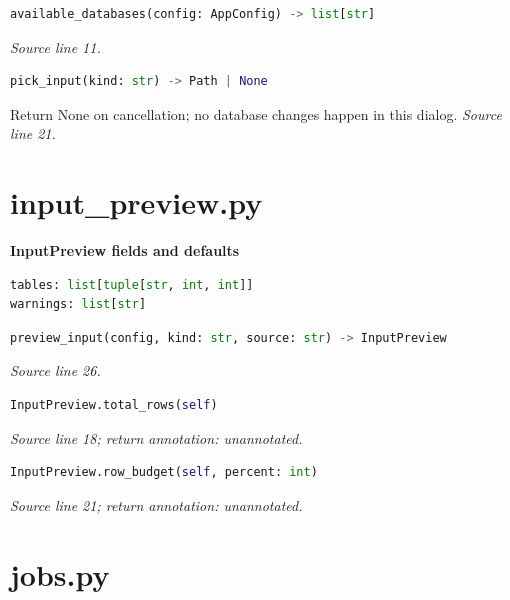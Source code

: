 \begin{lstlisting}[language=Python]
available_databases(config: AppConfig) -> list[str]
\end{lstlisting}


{\small \textit{Source line 11.}}



\begin{lstlisting}[language=Python]
pick_input(kind: str) -> Path | None
\end{lstlisting}


{\small Return None on cancellation; no database changes happen in this dialog. \textit{Source line 21.}}

\section{input\_preview.py}


\textbf{InputPreview fields and defaults}


\begin{lstlisting}[language=Python]
tables: list[tuple[str, int, int]]
warnings: list[str]
\end{lstlisting}




\begin{lstlisting}[language=Python]
preview_input(config, kind: str, source: str) -> InputPreview
\end{lstlisting}


{\small \textit{Source line 26.}}



\begin{lstlisting}[language=Python]
InputPreview.total_rows(self)
\end{lstlisting}


{\small \textit{Source line 18; return annotation: unannotated.}}



\begin{lstlisting}[language=Python]
InputPreview.row_budget(self, percent: int)
\end{lstlisting}


{\small \textit{Source line 21; return annotation: unannotated.}}

\section{jobs.py}

